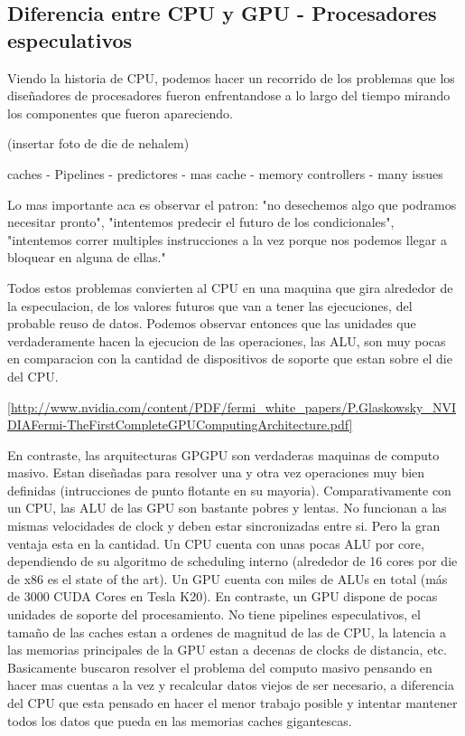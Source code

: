 \subsection{Diferencia entre CPU y GPU - Procesadores especulativos}
Viendo la historia de CPU, podemos hacer un recorrido de los problemas que los dise\~nadores de procesadores
fueron enfrentandose a lo largo del tiempo mirando los componentes que fueron apareciendo.

(insertar foto de die de nehalem)

caches - Pipelines - predictores - mas cache - memory controllers - many issues

Lo mas importante aca es observar el patron: "no desechemos algo que podramos necesitar pronto", 
"intentemos predecir el futuro de los condicionales", "intentemos correr multiples instrucciones a la vez 
porque nos podemos llegar a bloquear en alguna de ellas."

Todos estos problemas convierten al CPU en una maquina que gira alrededor de la especulacion, 
de los valores futuros que van a tener las ejecuciones, del probable reuso de datos.
Podemos observar entonces que las unidades que verdaderamente hacen la ejecucion de las operaciones,
las ALU, son muy pocas en comparacion con la cantidad de dispositivos de soporte que estan
sobre el die del CPU. 

\ref{http://www.nvidia.com/content/PDF/fermi_white_papers/P.Glaskowsky_NVIDIAFermi-TheFirstCompleteGPUComputingArchitecture.pdf}

En contraste, las arquitecturas GPGPU son verdaderas maquinas de computo masivo. Estan dise\~nadas para
resolver una y otra vez operaciones muy bien definidas (intrucciones de punto flotante en su mayoria).
Comparativamente con un CPU, las ALU de las GPU son bastante pobres y lentas. No funcionan a las mismas 
velocidades de clock y deben estar sincronizadas entre si. Pero la gran ventaja esta en la cantidad. 
Un CPU cuenta con unas pocas ALU por core, dependiendo de su algoritmo de scheduling interno 
(alrededor de 16 cores por die de x86 es el state of the art). Un GPU cuenta con miles de ALUs en total 
(m\'as de 3000 CUDA Cores en Tesla K20). En contraste, un GPU dispone 
de pocas unidades de soporte del procesamiento. No tiene pipelines especulativos, el tama\~no de las caches
estan a ordenes de magnitud de las de CPU, la latencia a las memorias principales de la GPU estan a 
decenas de clocks de distancia, etc. Basicamente buscaron resolver el problema del computo masivo pensando
en hacer mas cuentas a la vez y recalcular datos viejos de ser necesario, a diferencia del CPU que esta
pensado en hacer el menor trabajo posible y intentar mantener todos los datos que pueda en las memorias caches
gigantescas.
 
